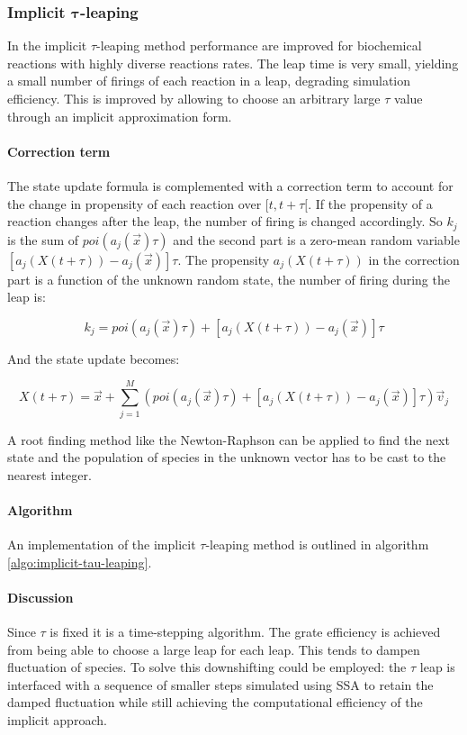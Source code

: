    \subsubsection{Implicit $\mathbf{\tau}$-leaping}
    In the implicit $\tau$-leaping method performance are improved for biochemical reactions with highly diverse reactions rates.
    The leap time is very small, yielding a small number of firings of each reaction in a leap, degrading simulation efficiency.
    This is improved by allowing to choose an arbitrary large $\tau$ value through an implicit approximation form.

      \paragraph{Correction term}
      The state update formula is complemented with a correction term to account for the change in propensity of each reaction over $[t,t+\tau[$.
      If the propensity of a reaction changes after the leap, the number of firing is changed accordingly.
      So $k_j$ is the sum of $poi(a_j(\vec{x})\tau)$ and the second part is a zero-mean random variable $[a_j(X(t+\tau))-a_j(\vec{x})]\tau$.
      The propensity $a_j(X(t+\tau))$ in the correction part is a function of the unknown random state, the number of firing during the leap is:

      $$k_j = poi(a_j(\vec{x})\tau) + [a_j(X(t+\tau))-a_j(\vec{x})]\tau$$

      And the state update becomes:

      $$X(t+\tau) = \vec{x} + \sum\limits_{j=1}^M\left(poi(a_j(\vec{x})\tau) + [a_j(X(t+\tau))-a_j(\vec{x})]\tau\right)\vec{v}_j$$

      A root finding method like the Newton-Raphson can be applied to find the next state and the population of species in the unknown vector has to be cast to the nearest integer.

      \paragraph{Algorithm}
      An implementation of the implicit $\tau$-leaping method is outlined in algorithm \ref{algo:implicit-tau-leaping}.

      

      \paragraph{Discussion}
      Since $\tau$ is fixed it is a time-stepping algorithm.
      The grate efficiency is achieved from being able to choose a large leap for each leap.
      This tends to dampen fluctuation of species.
      To solve this downshifting could be employed: the $\tau$ leap is interfaced with a sequence of smaller steps simulated using SSA to retain the damped fluctuation while still  achieving the computational efficiency of the implicit approach.








